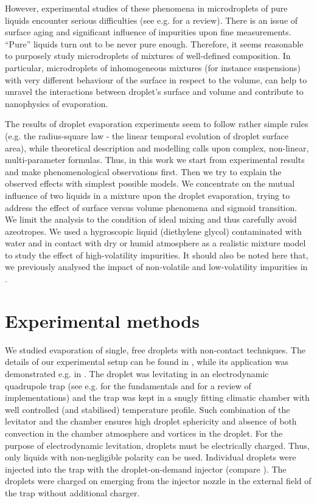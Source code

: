 \documentclass[twoside,twocolumn,9pt]{article}
\begin{document}
However, experimental studies of these phenomena in microdroplets of pure liquids encounter serious difficulties (see e.g. \cite{RoP} for a review). There is an issue of surface aging and significant influence of impurities upon fine measurements. ``Pure'' liquids turn out to be never pure enough. Therefore, it seems reasonable to purposely study microdroplets of mixtures of well-defined composition. In particular, microdroplets of inhomogeneous mixtures (for instance suspensions) with very different behaviour of the surface in respect to the volume, can help to unravel the interactions between droplet's surface and volume and contribute to nanophysics of evaporation.

The results of droplet evaporation experiments seem to follow rather simple rules (e.g. the radius-square law - the linear temporal evolution of droplet surface area), while theoretical description and modelling calls upon complex, non-linear, multi-parameter formulas. Thus, in this work we start from experimental results and make phenomenological observations first. Then we try to explain the observed effects with simplest possible models. We concentrate on the mutual influence of two liquids in a mixture upon the droplet evaporation, trying to address the effect of surface versus volume phenomena and sigmoid transition. We limit the analysis to the condition of ideal mixing and thus carefully avoid azeotropes. We used a hygroscopic liquid (diethylene glycol) contaminated with water and in contact with dry or humid atmosphere as a realistic mixture model to study the effect of high-volatility impurities. It should also be noted here that, we previously analysed the impact of non-volatile and low-volatility impurities in \cite{Acta}. 

\section{Experimental methods}

We studied evaporation of single, free droplets with non-contact techniques. The details of our experimental setup can be found in \cite{weightvsscatt,Smigacz}, while its application was demonstrated e.g. in \cite{Hi-precission,HK-soft_matter,RoP,vs_molecular_mass,Archer}. The droplet was levitating in an electrodynamic quadrupole trap (see e.g. \cite{Paul} for the fundamentals and \cite{Knoop,Major} for a review of implementations)  and the trap was kept in a snugly fitting climatic chamber with well controlled (and stabilised) temperature profile. Such combination of the levitator and the chamber ensures high droplet sphericity and absence of both convection in the chamber atmosphere and vortices in the droplet. For the purpose of electrodynamic levitation, droplets must be electrically charged. Thus, only liquids with non-negligible polarity can be used. Individual droplets were injected into the trap with the droplet-on-demand injector (compare \cite{Wriedt}). The droplets were charged on emerging from the injector nozzle in the external field of the trap without additional charger.
\end{document}

